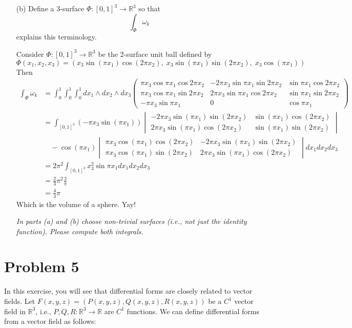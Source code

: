 \documentclass[11pt]{article}
\begin{document}
\begin{enumerate}
    \item[(b)] Define a 3-surface \(\Phi : [0, 1]^3 \to \mathbb{R}^3\) so that
    \[
    \int_{\Phi} \omega_k
    \]
    explains this terminology.
\begin{solution}
   Consider  \(\Phi : [0, 1]^3 \to \mathbb{R}^3\) be the 2-surface unit ball defined by
\[
\Phi(x_1, x_2, x_3) =  \left(
    x_3\sin( \pi x_1) \cos(2\pi x_2),\;
    x_3\sin( \pi x_1) \sin(2\pi x_2),\;
    x_3\cos(\pi x_1)
\right)
\]
Then 
\begin{align*}
    \int_{\Phi}\omega_k &= \int_0^1 \int_0^1 \int_0^1 dx_1 \wedge dx_2 \wedge dx_3 \begin{pmatrix}
        \pi x_3 \cos \pi x_1 \cos 2\pi x_2 & -2\pi x_3 \sin \pi x_1 \sin 2\pi x_2 & \sin \pi x_1 \cos 2\pi x_2\\
        \pi x_3 \cos \pi x_1 \sin 2\pi x_2 & 2\pi x_3 \sin \pi x_1 \cos 2\pi x_2 & \sin \pi x_1 \sin 2\pi x_2\\
        -\pi x_3\sin \pi x_1 & 0 & \cos \pi x_1
    \end{pmatrix}\\
    &= \int_{[0,1]^3} (-\pi x_3 \sin(\pi x_1))
\begin{vmatrix}
-2\pi x_3 \sin(\pi x_1) \sin(2\pi x_2) & \sin(\pi x_1) \cos(2\pi x_2) \\
2\pi x_3 \sin(\pi x_1) \cos(2\pi x_2) & \sin(\pi x_1) \sin(2\pi x_2)
\end{vmatrix} \\
&\quad - \cos(\pi x_1)
\begin{vmatrix}
\pi x_3 \cos(\pi x_1) \cos(2\pi x_2) & -2\pi x_3 \sin(\pi x_1) \sin(2\pi x_2) \\
\pi x_3 \cos(\pi x_1) \sin(2\pi x_2) & 2\pi x_3 \sin(\pi x_1) \cos(2\pi x_2)
\end{vmatrix} dx_1dx_2 dx_3\\
&= 2\pi^2\int_{[0,1]^3}x_3^2 \sin \pi x_1 dx_1 dx_2 dx_3\\
&= \frac{2}{3}\pi ^2 \frac{2}{\pi}\\
&= \frac{4}{3}\pi
\end{align*}
Which is the volume of a sphere. Yay!
\end{solution}

    \textit{In parts (a) and (b) choose non-trivial surfaces (i.e., not just the identity function). Please compute both integrals.}
\end{enumerate}

\newpage
\section*{Problem 5}
In this exercise, you will see that differential forms are closely related to vector fields. Let \(F(x, y, z) = (P(x, y, z), Q(x, y, z), R(x, y, z))\) be a \(C^1\) vector field in \(\mathbb{R}^3\), i.e., \(P,Q,R : \mathbb{R}^3 \to \mathbb{R}\) are \(C^1\) functions. We can define differential forms from a vector field as follows:
\end{document}
